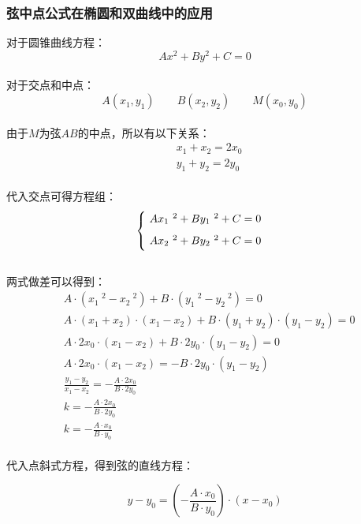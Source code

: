 \documentclass[UTF8]{ctexart}
\begin{document}
\subsubsection{弦中点公式在椭圆和双曲线中的应用}
    对于圆锥曲线方程：
    \setcounter{equation}{0}
    \begin{equation}
        Ax^2+By^2+C=0
    \end{equation}\\
    对于交点和中点：
    \begin{equation}
        A(x_1,y_1)\qquad B(x_2,y_2)\qquad M(x_0,y_0)
    \end{equation}\\
    由于$M$为弦$AB$的中点，所以有以下关系：
    \begin{align}
        &x_1+x_2=2x_0\\[2mm]
        &y_1+y_2=2y_0
    \end{align}\\
    代入交点可得方程组：
    \begin{equation}
        \begin{cases}
            \ Ax_1~^2+By_1~^2+C=0\\[2mm]
            \ Ax_2~^2+By_2~^2+C=0\vspace{2pt}
        \end{cases}
    \end{equation}\\[1mm]
    两式做差可以得到：
    \begin{align}
        &A\cdot\left(x_1~^2-x_2~^2\right)+B\cdot\left(y_1~^2-y_2~^2\right)=0\\[3mm]
        &A\cdot(x_1+x_2)\cdot(x_1-x_2)+B\cdot(y_1+y_2)\cdot(y_1-y_2)=0\\[3mm]
        &A\cdot 2x_0\cdot(x_1-x_2)+B\cdot 2y_0\cdot(y_1-y_2)=0\\[3mm]
        &A\cdot 2x_0\cdot(x_1-x_2)=-B\cdot 2y_0\cdot(y_1-y_2)\\[3mm]
        &\frac{y_1-y_2}{x_1-x_2}=-\frac{A\cdot 2x_0}{B\cdot 2y_0}\\[2mm]
        &k=-\frac{A\cdot 2x_0}{B\cdot 2y_0}\\[2mm]
        &k=-\frac{A\cdot x_0}{B\cdot y_0}
    \end{align}\\
    代入点斜式方程，得到弦的直线方程：
    \begin{large}
        \begin{equation*}
            y-y_0=\left(-\frac{A\cdot x_0}{B\cdot y_0}\right)\cdot(x-x_0)
        \end{equation*}
    \end{large}
\end{document}

